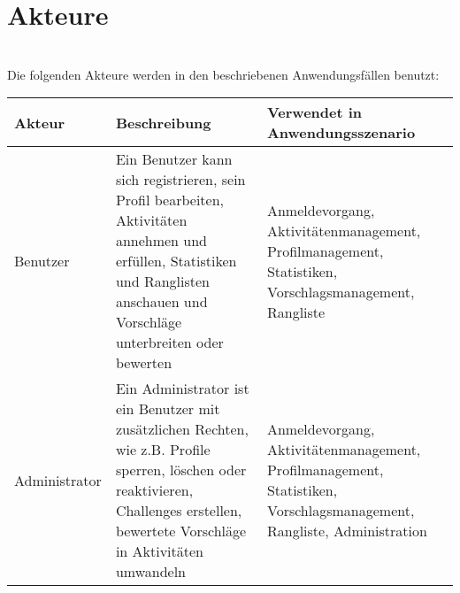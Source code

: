 \section{Akteure}\\
Die folgenden Akteure werden in den beschriebenen Anwendungsfällen benutzt: \\

\begin{tabular}{|p{5cm}|p{5cm}|p{5cm}}
\hline Akteur & Beschreibung & Verwendet in Anwendungsszenario \\
\hline Benutzer & Ein Benutzer kann sich registrieren, sein Profil bearbeiten, Aktivitäten annehmen und erfüllen, Statistiken und Ranglisten anschauen und Vorschläge unterbreiten oder bewerten & Anmeldevorgang, Aktivitätenmanagement, Profilmanagement, Statistiken, Vorschlagsmanagement, Rangliste \\
\hline Administrator & Ein Administrator ist ein Benutzer mit zusätzlichen Rechten, wie z.B. Profile sperren, löschen oder reaktivieren, Challenges erstellen, bewertete Vorschläge in Aktivitäten umwandeln & Anmeldevorgang, Aktivitätenmanagement, Profilmanagement, Statistiken, Vorschlagsmanagement, Rangliste, Administration\\
\end{tabular}
